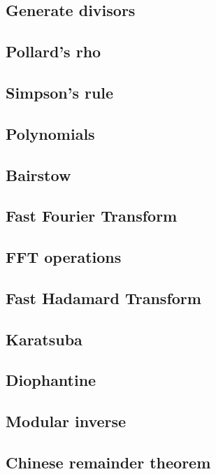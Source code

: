 \subsection{Generate divisors}
\subsection{Pollard's rho}
\subsection{Simpson's rule}
\subsection{Polynomials}
\subsection{Bairstow}
\subsection{Fast Fourier Transform}
\subsection{FFT operations}
\subsection{Fast Hadamard Transform}
\subsection{Karatsuba}
\subsection{Diophantine}
\subsection{Modular inverse}
\subsection{Chinese remainder theorem}
